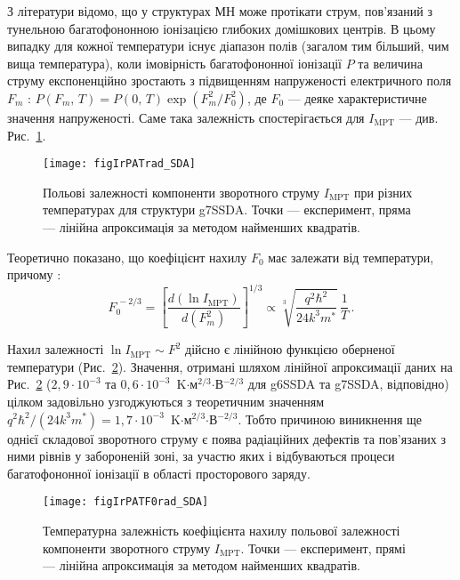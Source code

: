 З літератури \cite{Bulyarskii2001r,Evstropov,Ganichev:2000} відомо, що у структурах МН може протікати струм,
пов’язаний з тунельною багатофононною іонізацією глибоких домішкових центрів.
В цьому випадку для кожної температури існує діапазон полів (загалом тим більший, чим вища температура), коли імовірність багатофононної іонізації $P$
та величина струму експоненційно зростають з підвищенням напруженості електричного поля $F_m$ \cite{Bulyarskii2001r,Ganichev1997,Ganichev:2000}:
$P(F_m,\,T)=P(0,\,T) \exp(F_m^2/F_0^2)$,
де $F_0$ --- деяке характеристичне значення напруженості.
Саме така залежність спостерігається для $I_\mathrm{MPT}$ --- див. Рис.~\ref{figIrPATrad_SDA}.


\begin{figure}
\center
\texttt{[image: figIrPATrad\_SDA]}
\caption{\label{figIrPATrad_SDA}
Польові залежності компоненти зворотного струму $I_\mathrm{MPT}$ при різних температурах для структури g7SSDA.
Точки --- експеримент, пряма --- лінійна апроксимація за методом найменших квадратів.
}%
\end{figure}

Теоретично показано, що коефіцієнт нахилу $F_0$ має залежати від температури, причому \cite{Bulyarskii2001r,Ganichev1997,Ganichev:2000}:
\begin{equation}\label{eqPAT}
    F_0^{\,-2/3}=\left[\frac{d(\ln I_\mathrm{MPT})}{d(F_m^2)}\right]^{1/3}\propto \sqrt[3]{\frac{q^2\hbar^2}{24k^3m^*}}\,\frac{1}{T}\,.
\end{equation}

Нахил залежності $\ln I_\mathrm{MPT}\sim F^2$ дійсно є лінійною функцією оберненої температури (Рис.~\ref{figIrPATF0rad_SDA}).
Значення, отримані шляхом лінійної апроксимації даних на Рис.~\ref{figIrPATF0rad_SDA}
($2,9\cdot10^{-3}$ та $0,6\cdot10^{-3}$~K$\cdot$м$^{2/3}$$\cdot$В$^{-2/3}$ для g6SSDA та g7SSDA, відповідно)
цілком задовільно узгоджуються з теоретичним значенням
$q^2\hbar^2/(24k^3m^*)=1,7\cdot10^{-3}$~K$\cdot$м$^{2/3}$$\cdot$В$^{-2/3}$.
Тобто причиною виникнення ще однієї складової зворотного струму є поява радіаційних дефектів та пов’язаних з ними рівнів у забороненій зоні,
за участю яких і відбуваються процеси багатофононної іонізації в області просторового заряду.



\begin{figure}
\center
\texttt{[image: figIrPATF0rad\_SDA]}
\caption{\label{figIrPATF0rad_SDA}
Температурна залежність коефіцієнта нахилу польової залежності компоненти зворотного струму $I_\mathrm{MPT}$.
Точки --- експеримент, прямі --- лінійна апроксимація за методом найменших квадратів.
}%
\end{figure}


